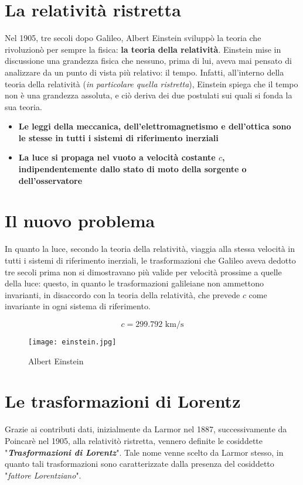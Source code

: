 \documentclass{article}
\begin{document}
\section{La relatività ristretta}
Nel 1905, tre secoli dopo Galileo, Albert Einstein sviluppò la
teoria che rivoluzionò per sempre la fisica:
\textbf{la teoria della relatività}. Einstein mise in discussione
una grandezza fisica che nessuno, prima di lui, aveva mai pensato
di analizzare da un punto di vista più relativo: il tempo. Infatti,
all'interno della teoria della relatività (\textit{in particolare quella
ristretta}), Einstein spiega che il tempo non è una grandezza
assoluta, e ciò deriva dei due postulati sui quali si fonda
la sua teoria.

\begin{itemize}
    \item{\textbf{Le leggi della meccanica, dell'elettromagnetismo e
    dell'ottica sono le stesse in tutti i sistemi di riferimento inerziali}}
    \item{\textbf{La luce si propaga nel vuoto a velocità costante \(c\),
    indipendentemente dallo stato di moto della sorgente o dell'osservatore}}
\end{itemize}

\section{Il nuovo problema}
In quanto la luce, secondo la teoria della relatività, viaggia alla
stessa velocità in tutti i sistemi di riferimento inerziali,
le trasformazioni che Galileo aveva dedotto tre secoli prima non si
dimostravano più valide per velocità prossime a quelle della luce:
questo, in quanto le trasformazioni galileiane non ammettono invarianti,
in disaccordo con la teoria della relatività, che prevede \(c\) come
invariante in ogni sistema di riferimento.

\begin{equation}
    \label{velocità della luce}
    c = 299.792 \textrm{\ km/s}
\end{equation}

\begin{figure}[htbp]
    \label{einstein}
    \centerline{\texttt{[image: einstein.jpg]}}
    \caption{Albert Einstein}
\end{figure}

\section{Le trasformazioni di Lorentz}
Grazie ai contributi dati, inizialmente da Larmor nel 1887, successivamente
da Poincarè nel 1905, alla relativitò ristretta, vennero definite le
cosiddette "\textbf{\textit{Trasformazioni di Lorentz}}". Tale nome venne
scelto da Larmor stesso, in quanto tali trasformazioni sono caratterizzate
dalla presenza del cosiddetto "\textit{fattore Lorentziano}".
\end{document}
